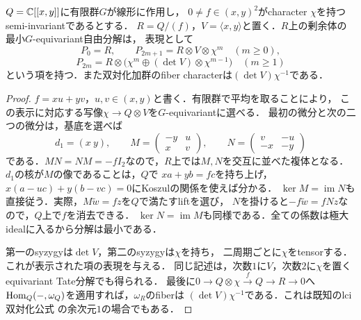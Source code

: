 \documentclass[11pt,a4paper]{ltjsarticle}
\begin{document}
\begin{lemma}[平面特異点のequivariant剰余体分解]\label{lem:v7-plane-tate}
$Q=\mathbb C[[x,y]]$に有限群$G$が線形に作用し，
$0\ne f\in(x,y)^2$がcharacter $\chi$を持つsemi-invariantであるとする．
$R=Q/(f)$，$V=\langle x,y\rangle$と置く．$R$上の剰余体の最小$G$-equivariant自由分解は，
表現として
\[
 P_0=R,\qquad P_{2m+1}=R\otimes V\otimes\chi^m\quad(m\geq0),
\]
\[
 P_{2m}=R\otimes
 \bigl(\chi^m\oplus(\det V)\otimes\chi^{m-1}\bigr)\quad(m\geq1)
\]
という項を持つ．また双対化加群のfiber characterは$(\det V)\chi^{-1}$である．
\end{lemma}
\begin{proof}
$f=xu+yv$，$u,v\in(x,y)$と書く．有限群で平均を取ることにより，
この表示に対応する写像$\chi\to Q\otimes V$を$G$-equivariantに選べる．
最初の微分と次の二つの微分は，基底を選べば
\[
 d_1=(x\ y),\qquad
 M=\begin{pmatrix}-y&u\\x&v\end{pmatrix},\qquad
 N=\begin{pmatrix}v&-u\\-x&-y\end{pmatrix}
\]
である．$MN=NM=-fI_2$なので，$R$上では$M,N$を交互に並べた複体となる．
$d_1$の核が$M$の像であることは，$Q$で
$xa+yb=fc$を持ち上げ，$x(a-uc)+y(b-vc)=0$にKoszulの関係を使えば分かる．
$\ker M=\operatorname{im}N$も直接従う．実際，$M\widetilde w=fz$を$Q$で満たすliftを選び，
$N$を掛けると$-f\widetilde w=fNz$なので，$Q$上で$f$を消去できる．
$\ker N=\operatorname{im}M$も同様である．全ての係数は極大idealに入るから分解は最小である．

第一のsyzygyは$\det V$，第二のsyzygyは$\chi$を持ち，
二周期ごとに$\chi$をtensorする．これが表示された項の表現を与える．
同じ記述は，次数$1$に$V$，次数$2$に$\chi$を置くequivariant Tate分解でも得られる．
最後に$0\to Q\otimes\chi\xrightarrow{f}Q\to R\to0$へ
$\operatorname{Hom}_Q(-,\omega_Q)$を適用すれば，$\omega_R$のfiberは
$(\det V)\chi^{-1}$である．これは既知のlci双対化公式
\cite[Theorem 3.8]{NironiDuality}の余次元$1$の場合でもある．
\end{proof}
\end{document}
